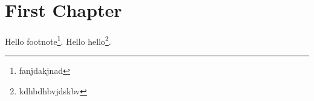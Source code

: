 \chapter{First Chapter}
\lipsum
Hello footnote\footnote{fanjdakjnad}.
Hello hello\footnote{kdhbdhbvjdskbv}.\cite{control}